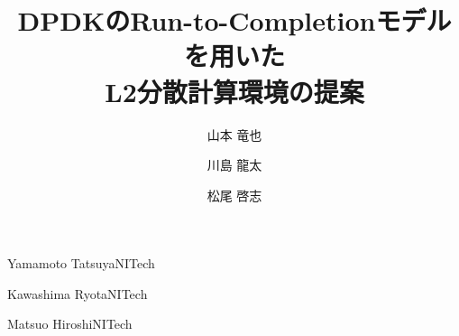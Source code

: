 \documentclass[submit,techrep,noauthor]{ipsj}
\begin{document}
\title{DPDKのRun-to-Completionモデルを用いた\\L2分散計算環境の提案}

\author{山本 竜也}{Yamamoto Tatsuya}{NITech}
\author{川島 龍太}{Kawashima Ryota}{NITech}
\author{松尾 啓志}{Matsuo Hiroshi}{NITech}



\maketitle













\end{document}
